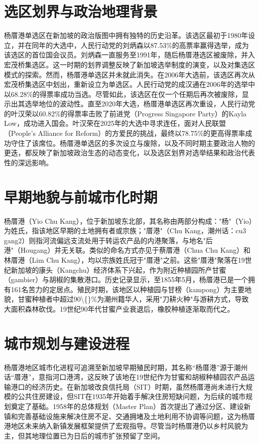 \documentclass[11pt,a4paper,twoside,openany]{book}
\begin{document}
\section{选区划界与政治地理背景}
杨厝港单选区在新加坡的政治版图中拥有独特的历史沿革。该选区最初于1980年设立，并在同年的大选中，人民行动党的刘炳森以87.53\%的高票率赢得选举，成为该选区的首位国会议员。刘炳森一直服务至1991年，随后杨厝港选区被废除，并入宏茂桥集选区。这一时期的划界调整反映了新加坡选举制度的演变，以及对集选区模式的探索。然而，杨厝港单选区并未就此消失。在2006年大选前，该选区再次从宏茂桥集选区中划出，重新设立为单选区。人民行动党的成汉通在2006年的选举中以68.28\%的得票率成功当选。尽管如此，该选区在仅一个任期后再次被废除，显示出其选举地位的波动性。直至2020年大选，杨厝港单选区再次重设，人民行动党的叶汉荣以60.82\%的得票率击败了前进党（Progress Singapore Party）的Kayla Low，成功进入国会。叶汉荣在2025年的大选中寻求连任，面对人民联盟（People's Alliance for Reform）的方爱民的挑战，最终以78.75\%的更高得票率成功守住了该席位。杨厝港单选区的多次设立与废除，以及不同时期主要政治人物的更迭，都反映了新加坡政治生态的动态变化，以及选区划界对选举结果和政治代表性的深远影响。

\section{早期地貌与前城市化时期}
杨厝港（Yio Chu Kang），位于新加坡东北部，其名称由两部分构成："杨"（Yio）为姓氏，指该地区早期的土地拥有者或宗族；"厝港"（Chu Kang，潮州话：cu3 gang2）则指河流偏远支流处用于转运农产品的内港聚落，与地名"后港"（Hougang）并无关联。类似的命名方式亦见于蔡厝港（Chua Chu Kang）和林厝港（Lim Chu Kang），均以宗族姓氏冠于"厝港"之前。这些"厝港"聚落在19世纪新加坡的康头（Kangchu）经济体系下兴起，作为附近种植园所产甘蜜（gambier）与胡椒的集散港口。历史记录显示，至1855年5月，杨厝港已是一个拥有161名苦力的定居点。殖民时期，该地区以种植园与甘榜（kampong）为主要地貌，甘蜜种植者中超过90\textbackslash\{\}\%为潮州籍华人，采用"刀耕火种"与游耕方式，导致大面积森林砍伐。19世纪90年代甘蜜产业衰退后，橡胶种植逐渐取而代之。

\section{城市规划与建设进程}
杨厝港地区城市化进程可追溯至新加坡早期殖民时期，其名称“杨厝港”源于潮州话“厝港”，意指河口港湾，这反映了该地在19世纪作为甘蜜和胡椒种植园农产品运输港口的经济历史。在新加坡改良信托局（SIT）时期，虽然杨厝港尚未进行大规模的公共住房建设，但SIT在1935年开始着手解决住房短缺问题，为后续的城市规划奠定了基础。1958年的总体规划（Master Plan）首次提出了通过分区、建设新镇和完善基础设施来解决住房不足、交通拥堵及土地利用不协调等问题，这为杨厝港地区未来纳入新镇发展框架提供了宏观指导。尽管当时杨厝港仍以乡村风貌为主，但其地理位置已为日后的城市扩张预留了空间。
\end{document}
